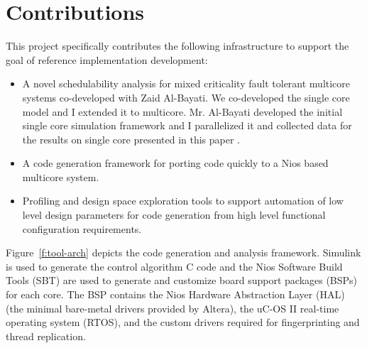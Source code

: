 	
\section{Contributions}

	This project specifically contributes the following infrastructure to support the goal of reference implementation development:
	\begin{itemize}
	  \item A novel schedulability analysis for mixed criticality fault tolerant multicore systems co-developed with Zaid Al-Bayati. 
	  We co-developed the single core model and I extended it to multicore. 
	  Mr. Al-Bayati developed the initial single core simulation framework and I parallelized it and collected data for the results on single core presented in this paper \cite{albayati2016modes}.
	  \item A code generation framework for porting code quickly to a Nios based multicore system.
	  \item Profiling and design space exploration tools to support automation of low level design parameters for code generation from high level functional configuration requirements.
	\end{itemize}
	
		Figure~\ref{f:tool-arch} depicts the code generation and analysis framework. 
	Simulink is used to generate the control algorithm C code and the Nios Software Build Tools (SBT) are used to generate and customize board support packages (BSPs) for each core. 
	The BSP contains the Nios Hardware Abstraction Layer (HAL) (the minimal bare-metal drivers provided by Altera), the uC-OS II real-time operating system (RTOS), and the custom drivers required for fingerprinting and thread replication. 

 
